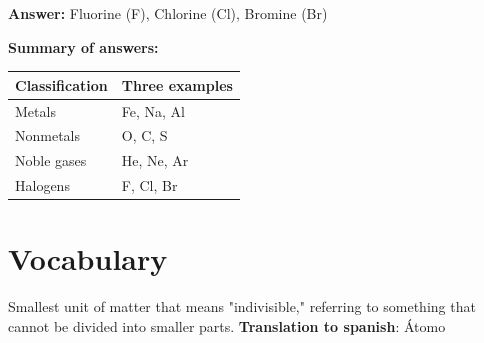 \begin{exercise}
\begin{solu}
        \textbf{Answer:} Fluorine (F), Chlorine (Cl), Bromine (Br)

        \textbf{Summary of answers:}
        \begin{center}
            \begin{tabular}{@{}ll@{}}
                \toprule
                \textbf{Classification} & \textbf{Three examples} \\
                \midrule
                Metals & Fe, Na, Al \\[3pt]
                Nonmetals & O, C, S \\[3pt]
                Noble gases & He, Ne, Ar \\[3pt]
                Halogens & F, Cl, Br \\
                \bottomrule
            \end{tabular}
        \end{center}
    \end{solu}
\end{exercise}
\section{Vocabulary}

\begin{vocabulary}[Atom]
      Smallest unit of matter that means "indivisible," referring to something that cannot be divided into smaller parts. \newline
       \textbf{Translation to spanish}: Átomo \newline
\end{vocabulary}

